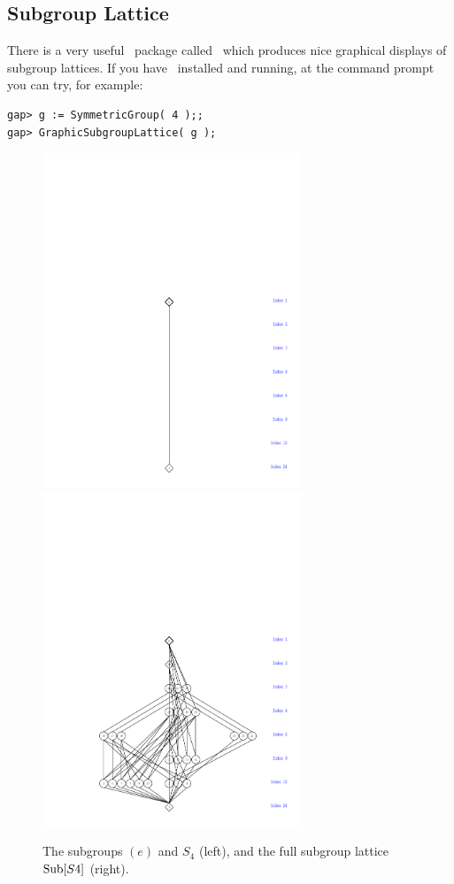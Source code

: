 \subsection{Subgroup Lattice}
There is a very useful \gap\ package called \xgap\ which produces nice graphical
displays of subgroup lattices.  If you have \xgap\ installed
and running, at the command prompt you can try, for example:
{\codesize
\begin{verbatim}
gap> g := SymmetricGroup( 4 );;
gap> GraphicSubgroupLattice( g );
\end{verbatim}
}  
\begin{figure}[!hb]
    \vspace{-4cm}
    \includegraphics[height=10cm]{inputs/trivialS4.pdf}%
    \includegraphics[height=10cm]{inputs/messyS4.pdf}%
    \caption{The subgroups $(e)$ and $S_4$ (left),
      and the full subgroup lattice $\mathrm{Sub}[S4]$ (right).}
    \label{fig:S4s}
\end{figure}
